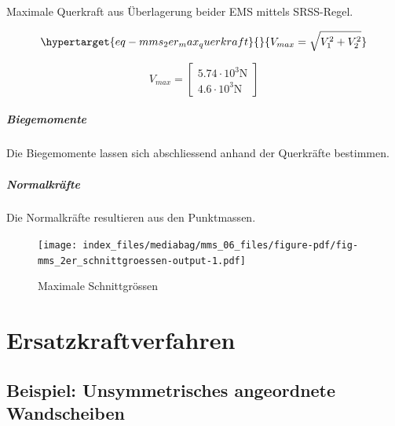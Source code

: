 \documentclass[
  letterpaper,
  DIV=11]{scrreprt}
\begin{document}
Maximale Querkraft aus Überlagerung beider EMS mittels SRSS-Regel.

\begin{equation}\protect\hypertarget{eq-mms_2er_max_querkraft}{}{
V_{max} = \sqrt{V_1^2 + V_2^2 }
}\label{eq-mms_2er_max_querkraft}\end{equation}

\begin{equation}V_{max} = \left[\begin{matrix}5.74 \cdot 10^{3} \text{N}\\4.6 \cdot 10^{3} \text{N}\end{matrix}\right]\end{equation}

\hypertarget{biegemomente-1}{%
\subsubsection{Biegemomente}\label{biegemomente-1}}

Die Biegemomente lassen sich abschliessend anhand der Querkräfte
bestimmen.

\hypertarget{normalkruxe4fte-1}{%
\subsubsection{Normalkräfte}\label{normalkruxe4fte-1}}

Die Normalkräfte resultieren aus den Punktmassen.

\begin{figure}[H]

{\centering \texttt{[image: index\_files/mediabag/mms\_06\_files/figure-pdf/fig-mms\_2er\_schnittgroessen-output-1.pdf]}

}

\caption{\label{fig-mms_2er_schnittgroessen}Maximale Schnittgrössen}

\end{figure}

\part{Ersatzkraftverfahren}

\hypertarget{beispiel-unsymmetrisches-angeordnete-wandscheiben}{%
\chapter{Beispiel: Unsymmetrisches angeordnete
Wandscheiben}\label{beispiel-unsymmetrisches-angeordnete-wandscheiben}}
\end{document}
